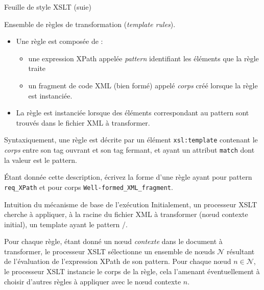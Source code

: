 \begin{frame}[allowframebreaks]{Feuille de style XSLT (suie)}

Ensemble de r\`egles de transformation (\textit{template rules}). 
\begin{itemize}
\item Une r\`egle est composée de :
\begin{itemize}
\item une expression XPath appelée \textit{pattern} identifiant les \'el\'ements que la r\`egle traite 
\item un fragment de code XML (bien form\'e) appel\'e \textit{corps} créé lorsque la r\`egle est instanci\'ee.
\end{itemize}
\item La r\`egle est instanci\'ee lorsque des \'el\'ements correspondant au pattern sont trouv\'es dans le fichier XML \`a transformer.
\end{itemize}
Syntaxiquement, une règle est décrite par un élément \texttt{xsl:template} contenant le \textit{corps} entre son tag ouvrant et son tag fermant, et ayant un attribut \texttt{match} dont la valeur est le pattern.


\begin{exoblock}
\'Etant donnée cette description, écrivez la forme d'une règle ayant pour pattern \texttt{req\_XPath} et pour corps \texttt{Well-formed\_XML\_fragment}.
\end{exoblock}

\framebreak

\begin{block}{Intuition du mécanisme de base de l'exécution}
Initialement, un processeur XSLT cherche à appliquer, à la racine du fichier XML à transformer (n{\oe}ud contexte initial), un template ayant le pattern /.  

\medskip

Pour chaque règle, étant donné un n{\oe}ud \textit{contexte} dans le document à transformer, le processeur XSLT sélectionne un ensemble de n{\oe}uds $\mathcal{N}$ résultant de l'évaluation de l'expression XPath de son pattern. Pour chaque n{\oe}ud $n \in \mathcal{N}$, le processeur XSLT instancie le corps de la règle, cela l'amenant éventuellement à choisir d'autres règles à appliquer avec le n{\oe}ud contexte $n$. 
\end{block}


\end{frame}
